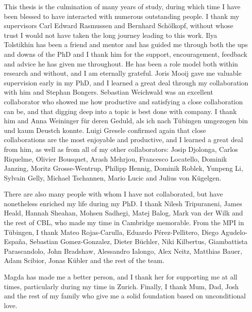 
\begin{acknowledgements}      


This thesis is the culmination of many years of study, during which time I have been blessed to have interacted with numerous outstanding people.
I thank my supervisors Carl Edward Rasmussen and Bernhard Sch\"olkopf, without whose trust I would not have taken the long journey leading to this work.
Ilya Tolstikhin has been a friend and mentor and has guided me through both the ups and downs of the PhD and I thank him for the support, encouragement, feedback and advice he has given me throughout. He has been a role model both within research and without, and I am eternally grateful.
Joris Mooij gave me valuable supervision early in my PhD, and I learned a great deal through my collaboration with him and Stephan Bongers.
Sebastian Weichwald was an excellent collaborator who showed me how productive and satisfying a close collaboration can be, and that digging deep into a topic is best done with company. I thank him and Anna Weininger f\"ur deren Geduld, als ich nach T\"ubingen umgezogen bin und kaum Deustch konnte.
Luigi Gresele confirmed again that close collaborations are the most enjoyable and productive, and I learned a great deal from him, as well as from all of my other collaborators:
Josip Djolonga, Carlos Riquelme, Olivier Bousquet, Arash Mehrjou, Francesco Locatello, Dominik Janzing, Moritz Grosse-Wentrup, Philipp Hennig, Dominik Roblek, Yunpeng Li, Sylvain Gelly, Michael Tschannen, Mario Lucic and Julius von K\"ugelgen.

There are also many people with whom I have not collaborated, but have nonetheless enriched my life during my PhD.
I thank Nilesh Tripuraneni, James Heald, Hannah Sheahan, Mohsen Sadhegi, Matej Balog, Mark van der Wilk and the rest of CBL, who made my time in Cambridge memorable.
From the MPI in T\"ubingen, I thank Mateo Rojas-Carulla, Eduardo Pérez-Pellitero, Diego Agudelo-Espa\~{n}a, Sebastian Gomez-Gonzalez, Dieter B\"uchler, Niki Kilbertus, Giambattista Parascandolo, John Bradshaw, Alessandro Ialongo, Alex Neitz, Matthias Bauer, Adam Scibior, Jonas K\"ubler and the rest of the team. 

Magda has made me a better person, and I thank her for supporting me at all times, particularly during my time in Zurich.
Finally, I thank Mum, Dad, Josh and the rest of my family who give me a solid foundation based on unconditional love.





\end{acknowledgements}
